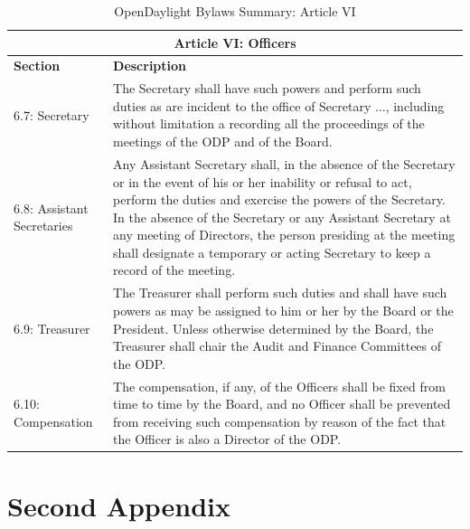 \documentclass[a4paper, 12pt]{book}
\begin{document}
\begin{table}[H]
  \begin{center}
    \begin{tabular}{ | p{4cm} | p{11cm} | }
    \toprule
    \multicolumn {2}{|c|}{\textbf{Article VI: Officers}} \\
    \hline
    \textbf{Section} & \textbf{Description} \\
    \hline
    \hline
    6.7: Secretary & The Secretary shall have such powers and perform such duties as are incident to the office of Secretary ..., including without limitation a recording all the proceedings of the meetings of the ODP and of the Board.\\
    \hline
    6.8: Assistant Secretaries & Any Assistant Secretary shall, in the absence of the Secretary or in the event of his or her inability or refusal to act, perform the duties and exercise the powers of the Secretary.  In the absence of the Secretary or any Assistant Secretary at any meeting of Directors, the person presiding at the meeting shall designate a temporary or acting Secretary to keep a record of the meeting.\\
    \hline
    6.9: Treasurer & The Treasurer shall perform such duties and shall have such powers as may be assigned to him or her by the Board or the President.  Unless otherwise determined by the Board, the Treasurer shall chair the Audit and Finance Committees of the ODP.\\
    \hline
    6.10: Compensation & The compensation, if any, of the Officers shall be fixed from time to time by the Board, and no Officer shall be prevented from receiving such compensation by reason of the fact that the Officer is also a Director of the ODP.\\
    \bottomrule
    \end{tabular}
    \caption{OpenDaylight Bylaws Summary: Article VI}
    \label{tab:odlbylaws-art06}
  \end{center}
\end{table}

\chapter{Second Appendix}




\label{Bibliography}
\end{document}

